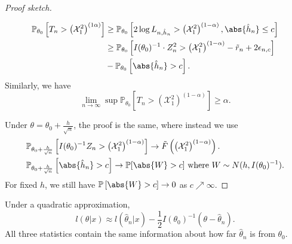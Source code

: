 \documentclass[a4paper]{article}
\begin{document}
\begin{itemize}[leftmargin=*]
\begin{proof}[Proof sketch]
\begin{itemize}[leftmargin=*]
			\begin{equation*}
				\begin{aligned}
					\mathbb{P}_{\theta_0} \left[T_n > \left(\mathcal{X}_1^2\right)^{(1\alpha)}\right] & \geq \mathbb{P}_{\theta_0} \left[2 \log L_{n,\hat{h}_n} > \left(\mathcal{X}_1^2\right)^{(1-\alpha)}, \abs{\hat{h}_n} \leq c \right] \\
					&\geq \mathbb{P}_{\theta_0} \left[I(\theta_0)^{-1} \cdot Z_n^2 > \left(\mathcal{X}_1^2\right)^{(1-\alpha)} - \tilde{r}_n + 2\epsilon_{n,c}\right] \\
					& - \mathbb{P}_{\theta_0} \left[\abs{\hat{h}_n} > c\right].
				\end{aligned}
			\end{equation*}
			Similarly, we have 
			\begin{equation*}
				\lim\limits_{n \to \infty} \sup \mathbb{P}_{\theta_0} \left[T_n > \left(\mathcal{X}_1^2\right)^{(1-\alpha)}\right] \geq \alpha.
			\end{equation*}
		\end{itemize}
		Under $\theta = \theta_0 + \frac{h}{\sqrt{n}}$, the proof is the same, where instead we use
		\begin{equation*}
			\begin{aligned}
				& \mathbb{P}_{\theta_0 + \frac{h}{\sqrt{n}}} \left[I(\theta_0)^{-1} Z_n > \left(\mathcal{X}_1^2\right)^{(1-\alpha)}\right] \to \tilde{F} \left(\left(\mathcal{X}_1^2\right)^{(1-\alpha)}\right). \\
				& \mathbb{P}_{\theta_0 + \frac{h}{\sqrt{n}}} \left[\abs{\hat{h}_n} > c\right] \to \mathbb{P}[\abs{W} > c] \ \text{where } W \sim N(h,I(\theta_0)^{-1}).
			\end{aligned}
		\end{equation*}
		For fixed $h$, we still have $\mathbb{P}\left[\abs{W} > c\right] \to 0$ as $c \nearrow \infty$.
	\end{proof}

	\begin{remark}
		Under a quadratic approximation,
		\begin{equation*}
			l(\theta|x) \approx l(\hat{\theta}_n | x) - \frac{1}{2} I(\theta_0)^{-1} \left(\theta - \hat{\theta}_n\right).
		\end{equation*}
		All three statistics contain the same information about how far $\hat{\theta}_n$ is from $\theta_0$.
	\end{remark}
	
	\begin{center}
\end{center}
\end{itemize}
\end{document}
